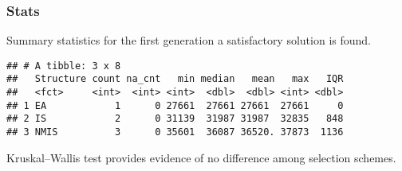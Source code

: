 \documentclass[]{book}
\newenvironment{Shaded}{\begin{snugshade}}{\end{snugshade}}
\newcommand{\CharTok}[1]{\textcolor[rgb]{0.31,0.60,0.02}{#1}}
\newcommand{\DataTypeTok}[1]{\textcolor[rgb]{0.13,0.29,0.53}{#1}}
\newcommand{\DecValTok}[1]{\textcolor[rgb]{0.00,0.00,0.81}{#1}}
\newcommand{\KeywordTok}[1]{\textcolor[rgb]{0.13,0.29,0.53}{\textbf{#1}}}
\newcommand{\NormalTok}[1]{#1}
\newcommand{\OperatorTok}[1]{\textcolor[rgb]{0.81,0.36,0.00}{\textbf{#1}}}
\newcommand{\OtherTok}[1]{\textcolor[rgb]{0.56,0.35,0.01}{#1}}
\newcommand{\StringTok}[1]{\textcolor[rgb]{0.31,0.60,0.02}{#1}}
\begin{document}
\hypertarget{stats-51}{%
\subsubsection{Stats}\label{stats-51}}

Summary statistics for the first generation a satisfactory solution is found.

\begin{Shaded}
\end{Shaded}

\begin{verbatim}
## # A tibble: 3 x 8
##   Structure count na_cnt   min median   mean   max   IQR
##   <fct>     <int>  <int> <int>  <dbl>  <dbl> <int> <dbl>
## 1 EA            1      0 27661  27661 27661  27661     0
## 2 IS            2      0 31139  31987 31987  32835   848
## 3 NMIS          3      0 35601  36087 36520. 37873  1136
\end{verbatim}

Kruskal--Wallis test provides evidence of no difference among selection schemes.
\end{document}
